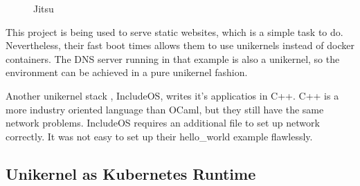 \begin{figure}[h!]
\centering
\begin {sequencediagram}


\end {sequencediagram}
\caption{Jitsu \cite{jitsu}}\label{fig:jitsu}
\end{figure}

This project is being used to serve static websites, which is a simple task to do. Nevertheless, their fast boot times allows them to use unikernels instead of docker containers. The DNS server running in that example is also a unikernel, so the environment can be achieved in a pure unikernel fashion.

Another unikernel stack , IncludeOS, writes it's applicatios in C++. C++ is a more industry oriented language than OCaml, but they still have the same network problems. IncludeOS requires an additional file to set up network correctly. It was not easy to set up their hello\_world example flawlessly.

\subsection{Unikernel as Kubernetes Runtime}

